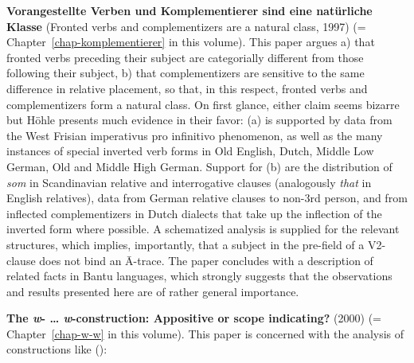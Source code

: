 \begin{refsection}
\textbf{Vorangestellte Verben und Komplementierer sind eine natürliche Klasse} (Fronted verbs and
complementizers are a natural class, 1997) (= Chapter~\ref{chap-komplementierer} in this
volume). This paper argues a) that fronted verbs preceding their subject are categorially different
from those following their subject, b) that complementizers are sensitive to the same difference in
relative placement, so that, in this respect, fronted verbs and complementizers form a natural
class. On first glance, either claim seems bizarre but Höhle presents much evidence in their favor:
(a) is supported by data from the West Frisian imperativus pro infinitivo phenomenon, as well as the
many instances of special inverted verb forms in Old English, Dutch,
Middle Low German, Old and Middle High German. Support for (b) are the distribution of \emph{som} in Scandinavian relative and interrogative clauses (analogously \emph{that} in English relatives), data from German relative clauses to non-3rd person, and from inflected complementizers in Dutch dialects that take up the inflection of the inverted form where possible. A schematized analysis is supplied for the relevant structures, which implies, importantly, that a subject in the pre-field of a V2-clause does not bind an Ā-trace. The paper concludes with a description of related facts in Bantu languages, which strongly suggests that the observations and results presented here are of rather general importance. 

\textbf{The \emph{w}- \ldots{} \emph{w}-construction: Appositive or scope indicating?} (2000) (= Chapter~\ref{chap-w-w} in this volume).  This paper is concerned with the analysis of constructions like ():


\end{refsection}
